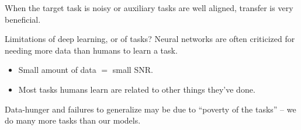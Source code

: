 \documentclass{beamer}
\begin{document}
\begin{frame}[standout]
When the target task is noisy or auxiliary tasks are well aligned, transfer is very beneficial.
\end{frame}

\begin{frame}[fragile]{Limitations of deep learning, or of tasks?}
Neural networks are often criticized for needing more data than humans to learn a task. 
\begin{itemize}
\item<2-> Small amount of data $=$ small SNR.
\item<3-> Most tasks humans learn are related to other things they've done. 
\end{itemize}
\end{frame}

\begin{frame}[standout]
Data-hunger and failures to generalize may be due to ``poverty of the tasks'' -- we do many more tasks than our models.\par
\end{frame}
\end{document}
